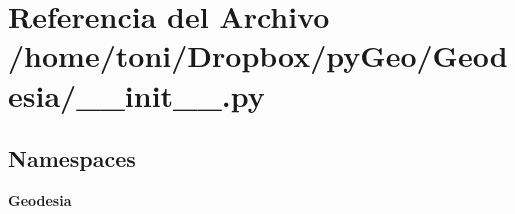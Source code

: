 \section{Referencia del Archivo /home/toni/\-Dropbox/py\-Geo/\-Geodesia/\-\_\-\-\_\-init\-\_\-\-\_\-.py}
\label{Geodesia_2____init_____8py}
\subsection*{Namespaces}
\begin{DoxyCompactItemize}
\item 
{\bf Geodesia}
\end{DoxyCompactItemize}
